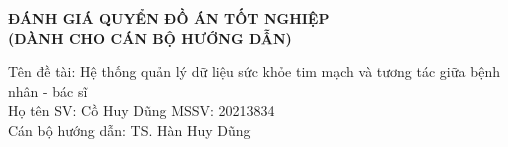 





\newpage 
\thispagestyle{empty}
\begin{center}
    \textbf{\fontsize{14pt}{0pt}\selectfont ĐÁNH GIÁ QUYỂN ĐỒ ÁN TỐT NGHIỆP}\\
    \vspace{-3pt}
    \textbf{\fontsize{13pt}{0pt}\selectfont (DÀNH CHO CÁN BỘ HƯỚNG DẪN) }
\end{center}
\vspace{-5pt}
\fontsize{12pt}{20pt}\selectfont Tên đề tài: Hệ thống quản lý dữ liệu sức khỏe tim mạch và tương tác giữa bệnh nhân - bác sĩ\\
\fontsize{12pt}{20pt}\selectfont Họ tên SV: Cồ Huy Dũng
\hspace{3.5cm} 
\fontsize{12pt}{20pt}\selectfont  MSSV:  20213834\\
\fontsize{12pt}{20pt}\selectfont Cán bộ hướng dẫn:  TS. Hàn Huy Dũng\\

\vspace{-2pt}

